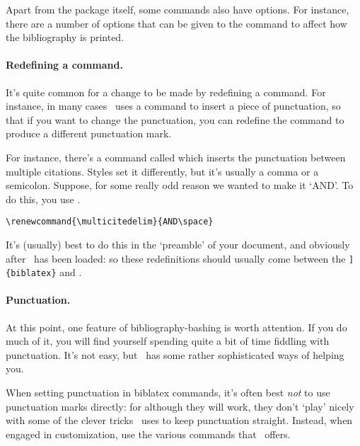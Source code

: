 Apart from the package itself, some commands also have options. For
instance, there are a number of options that can be given to the
 command to affect how the bibliography is
printed.

\paragraph{Redefining a command.} It's quite common for a change to be
made by redefining a command. For instance, in many cases \biblatex\
uses a command to insert a piece of punctuation, so that if you want
to change the punctuation, you can redefine the command to produce a
different punctuation mark.

For instance, there's a command called  which
inserts the punctuation between multiple citations. Styles set it
differently, but it's usually a comma or a semicolon. Suppose, for
some really odd reason we wanted to make it `AND'. To do this, you use .
\begin{verbatim}
\renewcommand{\multicitedelim}{AND\space}
\end{verbatim}

It's (usually) best to do this in the `preamble' of your document, and
obviously after \biblatex\ has been loaded: so these redefinitions
should usually come between the
\cs{usepackage[}\texttt{]\{biblatex\}} and
.

\paragraph{Punctuation.} At this point, one feature of
bibliography-bashing is worth attention. If you do much of it, you
will find yourself spending quite a bit of time fiddling with
punctuation. It's not easy, but \biblatex\ has some rather
sophisticated ways of helping you.

When setting punctuation in biblatex commands, it's often best
\emph{not} to use punctuation marks directly: for although they will
work, they don't `play' nicely with some of the clever tricks
\biblatex\ uses to keep punctuation straight. Instead, when engaged in
customization, use the various commands that \biblatex\ offers.

